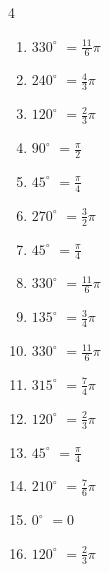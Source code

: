 \begin{multicols}{4}
\begin{enumerate}
  \item $\displaystyle 330^{\circ}$
        $\displaystyle =\frac{11}{6}\pi$

  \item $\displaystyle 240^{\circ}$
        $\displaystyle =\frac{4}{3}\pi$

  \item $\displaystyle 120^{\circ}$
        $\displaystyle =\frac{2}{3}\pi$

  \item $\displaystyle 90^{\circ}$
        $\displaystyle =\frac{\pi}{2}$

  \item $\displaystyle 45^{\circ}$
        $\displaystyle =\frac{\pi}{4}$

  \item $\displaystyle 270^{\circ}$
        $\displaystyle =\frac{3}{2}\pi$

  \item $\displaystyle 45^{\circ}$
        $\displaystyle =\frac{\pi}{4}$

  \item $\displaystyle 330^{\circ}$
        $\displaystyle =\frac{11}{6}\pi$

  \item $\displaystyle 135^{\circ}$
        $\displaystyle =\frac{3}{4}\pi$

  \item $\displaystyle 330^{\circ}$
        $\displaystyle =\frac{11}{6}\pi$

  \item $\displaystyle 315^{\circ}$
        $\displaystyle =\frac{7}{4}\pi$

\columnbreak %

\resetques

  \item $\displaystyle 120^{\circ}$
        $\displaystyle =\frac{2}{3}\pi$

  \item $\displaystyle 45^{\circ}$
        $\displaystyle =\frac{\pi}{4}$

  \item $\displaystyle 210^{\circ}$
        $\displaystyle =\frac{7}{6}\pi$

  \item $\displaystyle 0^{\circ}$
        $\displaystyle =0$

  \item $\displaystyle 120^{\circ}$
        $\displaystyle =\frac{2}{3}\pi$


\end{enumerate}
\end{multicols}

